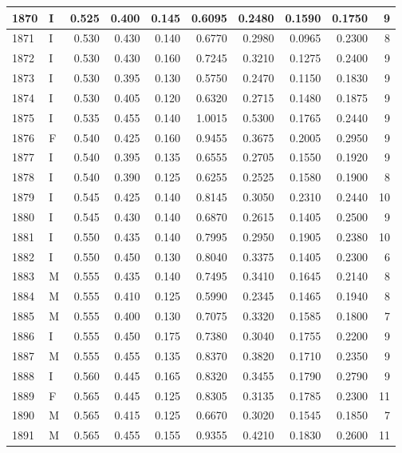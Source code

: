 \documentclass[9pt,twocolumn,twoside,]{pnas-new}
\begin{document}
\begin{tabular}{l|l|r|r|r|r|r|r|r|r}
\hline
1870 & I & 0.525 & 0.400 & 0.145 & 0.6095 & 0.2480 & 0.1590 & 0.1750 & 9\\
\hline
1871 & I & 0.530 & 0.430 & 0.140 & 0.6770 & 0.2980 & 0.0965 & 0.2300 & 8\\
\hline
1872 & I & 0.530 & 0.430 & 0.160 & 0.7245 & 0.3210 & 0.1275 & 0.2400 & 9\\
\hline
1873 & I & 0.530 & 0.395 & 0.130 & 0.5750 & 0.2470 & 0.1150 & 0.1830 & 9\\
\hline
1874 & I & 0.530 & 0.405 & 0.120 & 0.6320 & 0.2715 & 0.1480 & 0.1875 & 9\\
\hline
1875 & I & 0.535 & 0.455 & 0.140 & 1.0015 & 0.5300 & 0.1765 & 0.2440 & 9\\
\hline
1876 & F & 0.540 & 0.425 & 0.160 & 0.9455 & 0.3675 & 0.2005 & 0.2950 & 9\\
\hline
1877 & I & 0.540 & 0.395 & 0.135 & 0.6555 & 0.2705 & 0.1550 & 0.1920 & 9\\
\hline
1878 & I & 0.540 & 0.390 & 0.125 & 0.6255 & 0.2525 & 0.1580 & 0.1900 & 8\\
\hline
1879 & I & 0.545 & 0.425 & 0.140 & 0.8145 & 0.3050 & 0.2310 & 0.2440 & 10\\
\hline
1880 & I & 0.545 & 0.430 & 0.140 & 0.6870 & 0.2615 & 0.1405 & 0.2500 & 9\\
\hline
1881 & I & 0.550 & 0.435 & 0.140 & 0.7995 & 0.2950 & 0.1905 & 0.2380 & 10\\
\hline
1882 & I & 0.550 & 0.450 & 0.130 & 0.8040 & 0.3375 & 0.1405 & 0.2300 & 6\\
\hline
1883 & M & 0.555 & 0.435 & 0.140 & 0.7495 & 0.3410 & 0.1645 & 0.2140 & 8\\
\hline
1884 & M & 0.555 & 0.410 & 0.125 & 0.5990 & 0.2345 & 0.1465 & 0.1940 & 8\\
\hline
1885 & M & 0.555 & 0.400 & 0.130 & 0.7075 & 0.3320 & 0.1585 & 0.1800 & 7\\
\hline
1886 & I & 0.555 & 0.450 & 0.175 & 0.7380 & 0.3040 & 0.1755 & 0.2200 & 9\\
\hline
1887 & M & 0.555 & 0.455 & 0.135 & 0.8370 & 0.3820 & 0.1710 & 0.2350 & 9\\
\hline
1888 & I & 0.560 & 0.445 & 0.165 & 0.8320 & 0.3455 & 0.1790 & 0.2790 & 9\\
\hline
1889 & F & 0.565 & 0.445 & 0.125 & 0.8305 & 0.3135 & 0.1785 & 0.2300 & 11\\
\hline
1890 & M & 0.565 & 0.415 & 0.125 & 0.6670 & 0.3020 & 0.1545 & 0.1850 & 7\\
\hline
1891 & M & 0.565 & 0.455 & 0.155 & 0.9355 & 0.4210 & 0.1830 & 0.2600 & 11\\

\end{tabular}
\end{document}
